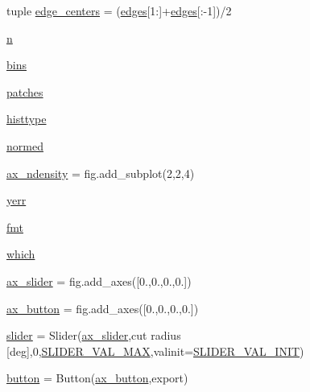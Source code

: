 \begin{DoxyCompactItemize}
\item 
tuple \hyperlink{namespaceplot__Draco__SDSS__CMD__CMcut_a10bd1df15af258413e5d0d16afbd3ff4}{edge\+\_\+centers} = (\hyperlink{namespaceplot__Draco__SDSS__CMD__CMcut_a70e4e337d90cea561909f4aba7cd8af2}{edges}\mbox{[}1\+:\mbox{]}+\hyperlink{namespaceplot__Draco__SDSS__CMD__CMcut_a70e4e337d90cea561909f4aba7cd8af2}{edges}\mbox{[}\+:-\/1\mbox{]})/2
\item 
\hyperlink{namespaceplot__Draco__SDSS__CMD__CMcut_ac6f096ee0c5751c15a3a4788f13fc307}{n}
\item 
\hyperlink{namespaceplot__Draco__SDSS__CMD__CMcut_a418e76672a07e876f21993cee46fa0c2}{bins}
\item 
\hyperlink{namespaceplot__Draco__SDSS__CMD__CMcut_a0ea6c66bfb2a3d3569a30378ccbc9550}{patches}
\item 
\hyperlink{namespaceplot__Draco__SDSS__CMD__CMcut_ad93ceb4f047f0acf05e17707f3bcf0e7}{histtype}
\item 
\hyperlink{namespaceplot__Draco__SDSS__CMD__CMcut_a76213cbf7bbd778498512a9abf84642c}{normed}
\item 
\hyperlink{namespaceplot__Draco__SDSS__CMD__CMcut_ae9ea8bdfc2a193b917240b9032824549}{ax\+\_\+ndensity} = fig.\+add\+\_\+subplot(2,2,4)
\item 
\hyperlink{namespaceplot__Draco__SDSS__CMD__CMcut_a2190c9d49488ebea9f4183f66e4720d0}{yerr}
\item 
\hyperlink{namespaceplot__Draco__SDSS__CMD__CMcut_ac09098d64f2f877b850de319b2f90cbd}{fmt}
\item 
\hyperlink{namespaceplot__Draco__SDSS__CMD__CMcut_af21f74f14e5bd8fb8cdc1d4b060f0361}{which}
\item 
\hyperlink{namespaceplot__Draco__SDSS__CMD__CMcut_ab84d6f8e5855eb92875aa98938f791a3}{ax\+\_\+slider} = fig.\+add\+\_\+axes(\mbox{[}0.,0.,0.,0.\mbox{]})
\item 
\hyperlink{namespaceplot__Draco__SDSS__CMD__CMcut_a89c6fffbcf2ec676181b539218612288}{ax\+\_\+button} = fig.\+add\+\_\+axes(\mbox{[}0.,0.,0.,0.\mbox{]})
\item 
\hyperlink{namespaceplot__Draco__SDSS__CMD__CMcut_a60fa9b66f1aaed9979524b6928dd3ab8}{slider} = Slider(\hyperlink{namespaceplot__Draco__SDSS__CMD__CMcut_ab84d6f8e5855eb92875aa98938f791a3}{ax\+\_\+slider},\textquotesingle{}cut radius \mbox{[}deg\mbox{]}\textquotesingle{},0,\hyperlink{namespaceplot__Draco__SDSS__CMD__CMcut_ad39261f3e28c13131eb72d456f3d7233}{S\+L\+I\+D\+E\+R\+\_\+\+V\+A\+L\+\_\+\+M\+AX},valinit=\hyperlink{namespaceplot__Draco__SDSS__CMD__CMcut_a47a66344d34ddb1e3eadf4fcb3d12021}{S\+L\+I\+D\+E\+R\+\_\+\+V\+A\+L\+\_\+\+I\+N\+IT})
\item 
\hyperlink{namespaceplot__Draco__SDSS__CMD__CMcut_a504f89601b402fcd9293b8d4334b638b}{button} = Button(\hyperlink{namespaceplot__Draco__SDSS__CMD__CMcut_a89c6fffbcf2ec676181b539218612288}{ax\+\_\+button},\textquotesingle{}export\textquotesingle{})
\end{DoxyCompactItemize}


